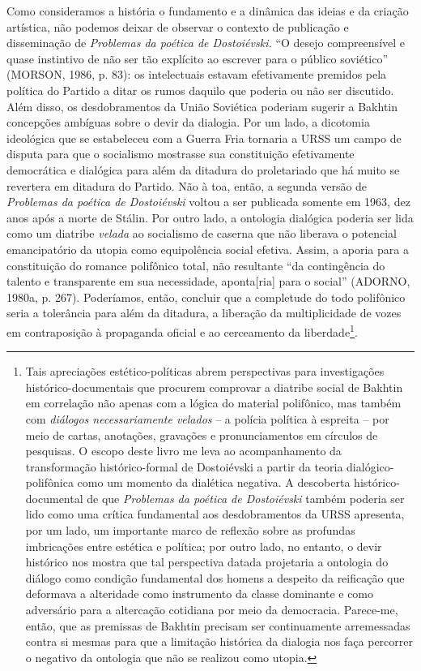 Como consideramos a história o fundamento e a dinâmica das ideias e da
criação artística, não podemos deixar de observar o contexto de
publicação e disseminação de \emph{Problemas da poética de Dostoiévski.}
``O desejo compreensível e quase instintivo de não ser tão explícito ao
escrever para o público soviético'' (MORSON, 1986, p. 83): os
intelectuais estavam efetivamente premidos pela política do Partido a
ditar os rumos daquilo que poderia ou não ser discutido. Além disso, os
desdobramentos da União Soviética poderiam sugerir a Bakhtin concepções
ambíguas sobre o devir da dialogia. Por um lado, a dicotomia ideológica
que se estabeleceu com a Guerra Fria tornaria a URSS um campo de disputa
para que o socialismo mostrasse sua constituição efetivamente
democrática e dialógica para além da ditadura do proletariado que há
muito se revertera em ditadura do Partido. Não à toa, então, a segunda
versão de \emph{Problemas da poética de Dostoiévski} voltou a ser
publicada somente em 1963, dez anos após a morte de Stálin. Por outro
lado, a ontologia dialógica poderia ser lida como um diatribe
\emph{velada} ao socialismo de caserna que não liberava o potencial
emancipatório da utopia como equipolência social efetiva. Assim, a
aporia para a constituição do romance polifônico total, não resultante
``da contingência do talento e transparente em sua necessidade,
aponta{[}ria{]} para o social'' (ADORNO, 1980a, p. 267). Poderíamos,
então, concluir que a completude do todo polifônico seria a tolerância
para além da ditadura, a liberação da multiplicidade de vozes em
contraposição à propaganda oficial e ao cerceamento da
liberdade\footnote{Tais apreciações estético-políticas abrem
  perspectivas para investigações histórico-documentais que procurem
  comprovar a diatribe social de Bakhtin em correlação não apenas com a
  lógica do material polifônico, mas também com \emph{diálogos
  necessariamente velados} -- a polícia política à espreita -- por meio
  de cartas, anotações, gravações e pronunciamentos em círculos de
  pesquisas. O escopo deste livro me leva ao acompanhamento da
  transformação histórico-formal de Dostoiévski a partir da teoria
  dialógico-polifônica como um momento da dialética negativa. A
  descoberta histórico-documental de que \emph{Problemas da poética de
  Dostoiévski} também poderia ser lido como uma crítica fundamental aos
  desdobramentos da URSS apresenta, por um lado, um importante marco de
  reflexão sobre as profundas imbricações entre estética e política; por
  outro lado, no entanto, o devir histórico nos mostra que tal
  perspectiva datada projetaria a ontologia do diálogo como condição
  fundamental dos homens a despeito da reificação que deformava a
  alteridade como instrumento da classe dominante e como adversário para
  a altercação cotidiana por meio da democracia. Parece-me, então, que
  as premissas de Bakhtin precisam ser continuamente arremessadas contra
  si mesmas para que a limitação histórica da dialogia nos faça
  percorrer o negativo da ontologia que não se realizou como utopia.}.

